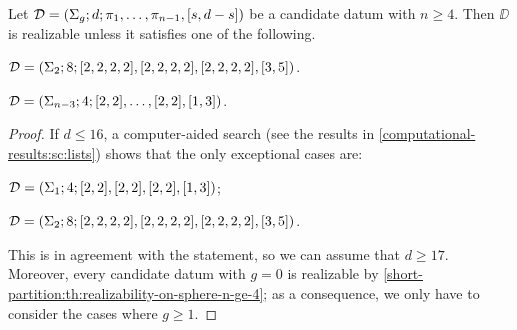 \begin{theorem}\label{short-partition:th:realizability-on-higher-genus-n-ge-4}
Let $\mathcal{D}=(\Sigma_{g};d;\pi_1,\ldots,\pi_{n-1},[s,d-s])$ be a candidate datum with $n\ge 4$. Then $\DD$ is realizable unless it satisfies one of the following.
\begin{enumarabic}
\item $\mathcal{D}=(\Sigma_{2};8;[2,2,2,2],[2,2,2,2],[2,2,2,2],[3,5])$.
\item $\mathcal{D}=(\Sigma_{n-3};4;[2,2],\ldots,[2,2],[1,3])$.
\end{enumarabic}
\end{theorem}
\begin{proof}
If $d\le 16$, a computer-aided search (see the results in \cref{computational-results:sc:lists}) shows that the only exceptional cases are:
\begin{enumarabic}
\item $\mathcal{D}=(\Sigma_{1};4;[2, 2],[2, 2],[2, 2],[1, 3])$;
\item $\mathcal{D}=(\Sigma_{2};8;[2, 2, 2, 2],[2, 2, 2, 2],[2, 2, 2, 2],[3, 5])$.
\end{enumarabic}
This is in agreement with the statement, so we can assume that $d\ge 17$. Moreover, every candidate datum with $g=0$ is realizable by \cref{short-partition:th:realizability-on-sphere-n-ge-4}; as a consequence, we only have to consider the cases where $g\ge 1$.


\end{proof}

